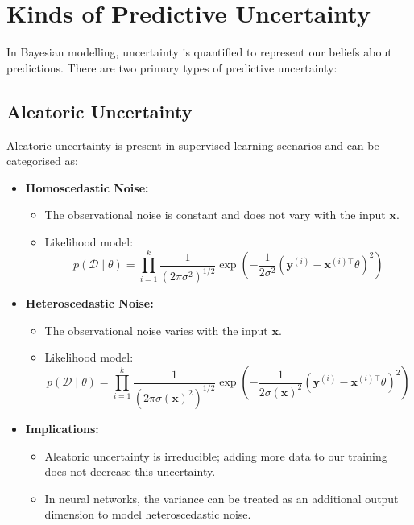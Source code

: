 \section{Kinds of Predictive Uncertainty}

In Bayesian modelling, uncertainty is quantified to represent our beliefs about predictions. There are two primary types of predictive uncertainty:



\subsection{Aleatoric Uncertainty}

Aleatoric uncertainty is present in supervised learning scenarios and can be categorised as:

\begin{itemize}
    \item \textbf{Homoscedastic Noise:}
          \begin{itemize}
              \item The observational noise is constant and does not vary with the input $\mathbf{x}$.
              \item Likelihood model:
                    \[
                        p(\mathcal{D} \mid \theta) = \prod_{i=1}^k \frac{1}{(2\pi\sigma^2)^{1/2}} \exp\left(-\frac{1}{2\sigma^2} (\mathbf{y}^{(i)} - \mathbf{x}^{(i)\top}\theta)^2 \right)
                    \]
          \end{itemize}
    \item \textbf{Heteroscedastic Noise:}
          \begin{itemize}
              \item The observational noise varies with the input $\mathbf{x}$.
              \item Likelihood model:
                    \[
                        p(\mathcal{D} \mid \theta) = \prod_{i=1}^k \frac{1}{(2\pi\sigma(\mathbf{x})^2)^{1/2}} \exp\left(-\frac{1}{2\sigma(\mathbf{x})^2} (\mathbf{y}^{(i)} - \mathbf{x}^{(i)\top}\theta)^2 \right)
                    \]
          \end{itemize}
    \item \textbf{Implications:}
          \begin{itemize}
              \item Aleatoric uncertainty is irreducible; adding more data to our training does not decrease this uncertainty.
              \item In neural networks, the variance can be treated as an additional output dimension to model heteroscedastic noise.
          \end{itemize}
\end{itemize}

